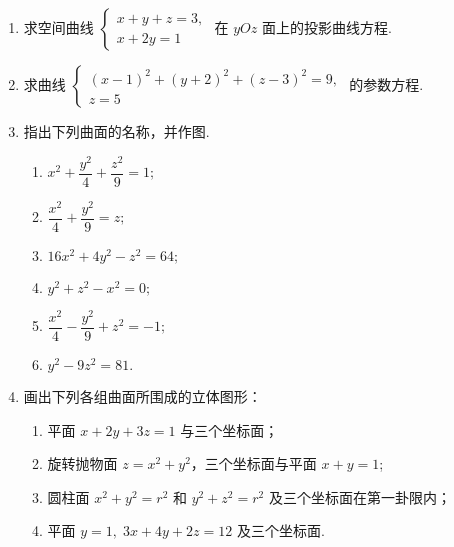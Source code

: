 \begin{enumerate}
    \item 求空间曲线 $\begin{cases}
        x+y+z=3,\\
        x+2y=1
    \end{cases}$ 在 $yOz$ 面上的投影曲线方程.

    \item  求曲线 $\begin{cases}
        (x-1)^2+(y+2)^2+(z-3)^2=9,\\
        z=5
    \end{cases}$ 的参数方程.

    \item 指出下列曲面的名称，并作图.
    \begin{enumerate}[(1)]\setlength{\itemsep}{5pt}\setlength{\topsep}{15pt}
        \item $x^2+\dfrac{y^2}{4}+\dfrac{z^2}{9}=1;$
        \item $\dfrac{x^2}{4}+\dfrac{y^2}{9}=z;$
        \item $16x^2+4y^2-z^2=64;$
        \item $y^2+z^2-x^2=0;$
        \item $\dfrac{x^2}{4}-\dfrac{y^2}{9}+z^2=-1;$
        \item $y^2-9z^2=81.$
    \end{enumerate}

    \item 画出下列各组曲面所围成的立体图形：
    \begin{enumerate}
        \item 平面 $x+2y+3z=1$ 与三个坐标面；
        \item 旋转抛物面 $z=x^2+y^2$，三个坐标面与平面 $x+y=1$;
        \item 圆柱面 $x^2+y^2=r^2$ 和 $y^2+z^2=r^2$ 及三个坐标面在第一卦限内；
        \item 平面 $y=1,\;3x+4y+2z=12$ 及三个坐标面.
    \end{enumerate}
\end{enumerate}





